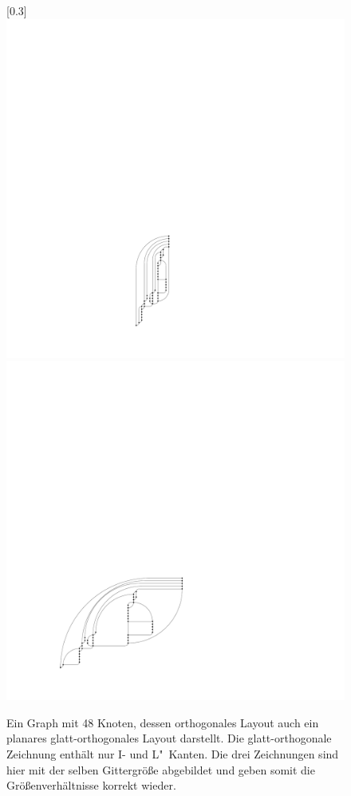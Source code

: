 \documentclass[a4paper]{scrreprt}
\theoremstyle{definition}
\begin{document}
\begin{figure}[h]
        \quad
       [0.3\textwidth]
            {\includegraphics[scale=.7]{compliantGraph/isOk}}
        \quad
            {\includegraphics[scale=.7]{compliantGraph/isHuge}}
 
 
        \caption{Ein Graph mit 48 Knoten, dessen orthogonales Layout auch ein planares glatt-orthogonales Layout darstellt. Die glatt-orthogonale Zeichnung enthält nur I- und L"~Kanten. Die drei Zeichnungen sind hier mit der selben Gittergröße abgebildet und geben somit die Größenverhältnisse korrekt wieder.}
        \label{fig:smoothOkness}
\end{figure}
\end{document}
